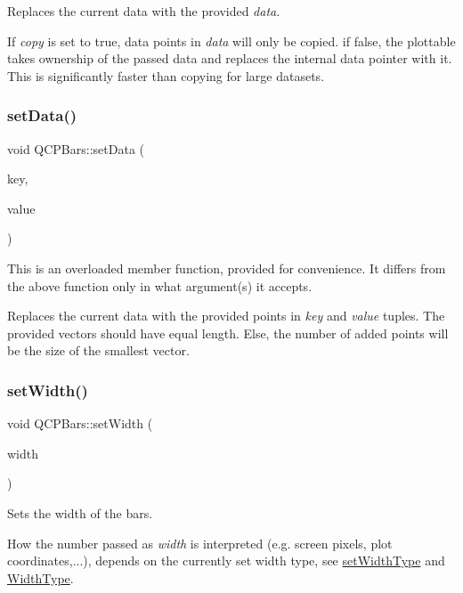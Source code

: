 Replaces the current data with the provided {\itshape data}.

If {\itshape copy} is set to true, data points in {\itshape data} will only be copied. if false, the plottable takes ownership of the passed data and replaces the internal data pointer with it. This is significantly faster than copying for large datasets. \hypertarget{class_q_c_p_bars_a3efded5df4a82ecb201f7c28099fa2e5}{}\label{class_q_c_p_bars_a3efded5df4a82ecb201f7c28099fa2e5} 
\subsubsection{\texorpdfstring{set\+Data()}{setData()}\hspace{0.1cm}{\footnotesize\ttfamily [2/2]}}
{\footnotesize\ttfamily void Q\+C\+P\+Bars\+::set\+Data (\begin{DoxyParamCaption}\item[{const Q\+Vector$<$ double $>$ \&}]{key,  }\item[{const Q\+Vector$<$ double $>$ \&}]{value }\end{DoxyParamCaption})}

This is an overloaded member function, provided for convenience. It differs from the above function only in what argument(s) it accepts.

Replaces the current data with the provided points in {\itshape key} and {\itshape value} tuples. The provided vectors should have equal length. Else, the number of added points will be the size of the smallest vector. \hypertarget{class_q_c_p_bars_afec6116579d44d5b706e0fa5e5332507}{}\label{class_q_c_p_bars_afec6116579d44d5b706e0fa5e5332507} 
\subsubsection{\texorpdfstring{set\+Width()}{setWidth()}}
{\footnotesize\ttfamily void Q\+C\+P\+Bars\+::set\+Width (\begin{DoxyParamCaption}\item[{double}]{width }\end{DoxyParamCaption})}

Sets the width of the bars.

How the number passed as {\itshape width} is interpreted (e.\+g. screen pixels, plot coordinates,...), depends on the currently set width type, see \hyperlink{class_q_c_p_bars_adcaa3b41281bb2c0f7949b341592fcc0}{set\+Width\+Type} and \hyperlink{class_q_c_p_bars_a65dbbf1ab41cbe993d71521096ed4649}{Width\+Type}. \hypertarget{class_q_c_p_bars_adcaa3b41281bb2c0f7949b341592fcc0}{}\label{class_q_c_p_bars_adcaa3b41281bb2c0f7949b341592fcc0} 
